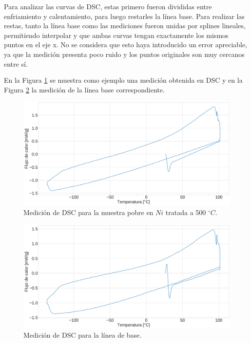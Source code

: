 \documentclass[12pt]{article}
\theoremstyle{definition}
\theoremstyle{remark}
\begin{document}
{Para analizar las curvas de DSC, estas primero fueron divididas entre enfriamiento y calentamiento, para luego restarles la línea base. Para realizar las restas, tanto la línea base como las mediciones fueron unidas por splines lineales, permitiendo interpolar y que ambas curvas tengan exactamente los mismos puntos en el eje x. No se considera que esto haya introducido un error apreciable, ya que la medición presenta poco ruido y los puntos originales son muy cercanos entre sí.

En la Figura \ref{MeasureExample} se muestra como ejemplo una medición obtenida en DSC y en la Figura \ref{BaseLine} la medición de la línea base correspondiente.

\begin{figure}[H]
	\centering	
	\includegraphics[scale=0.1]{img/500NiPoorExample}
	\caption{Medición de DSC para la muestra pobre en $Ni$ tratada a 500 $^\circ C$.}
	\label{MeasureExample}
\end{figure}

\begin{figure}[H]
	\centering
	\includegraphics[scale=0.1]{img/BaseLine}
	\caption{Medición de DSC para la línea de base.}
	\label{BaseLine}
\end{figure}

}
\end{document}
